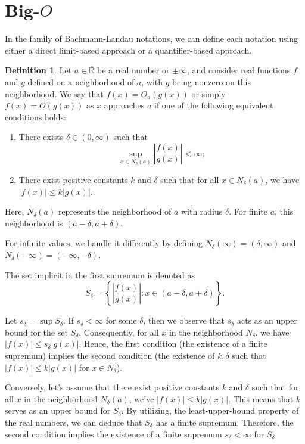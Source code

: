 \documentclass[9pt]{report}
\theoremstyle{definition}
\newtheorem{definition}{Definition}
\newcommand\RRE{\overline{\mathbb R}}
\begin{document}
\section{Big-$O$}\label{ssec:bigo}

In the family of Bachmann-Landau notations, we can define each notation using either a direct limit-based approach or a quantifier-based approach.

\begin{definition}
    Let \(a \in \RRE\) be a real number or \(\pm \infty\), and consider real functions \(f\) and \(g\) defined on a neighborhood of \(a\), with \(g\) being nonzero on this neighborhood. We say that \(f(x) = O_a(g(x))\) or simply \(f(x) = O(g(x))\) as \(x\) approaches \(a\) if one of the following equivalent conditions holds:
    \begin{enumerate}
        \item There exists \(\delta \in (0, \infty)\) such that
            \[\sup_{x \in N_{\delta}(a)} \left| \frac{f(x)}{g(x)} \right| < \infty;\]
        \item There exist positive constants \(k\) and \(\delta\) such that for all \(x \in N_{\delta}(a)\), we have \(\left| f(x) \right| \leq k \left| g(x) \right|\).
    \end{enumerate}
\end{definition}

Here, \(N_{\delta}(a)\) represents the neighborhood of \(a\) with radius \(\delta\). For finite \(a\), this neighborhood is \((a-\delta, a+\delta)\).

For infinite values, we handle it differently by defining \(N_{\delta}(\infty) = (\delta, \infty)\) and \(N_{\delta}(-\infty) = (-\infty, -\delta)\).

The set implicit in the first supremum is denoted as
\[S_{\delta} = \left\{ \left| \frac{f(x)}{g(x)} \right| : x \in (a - \delta, a + \delta) \right\}.\]

Let \(s_{\delta} = \sup S_{\delta}\). If \(s_{\delta} < \infty\) for some \(\delta\), then we observe that \(s_{\delta}\) acts as an upper bound for the set \(S_{\delta}\). Consequently, for all \(x\) in the neighborhood \(N_{\delta}\), we have \(\left| f(x) \right| \leq s_{\delta} \left| g(x) \right|\). Hence, the first condition (the existence of a finite supremum) implies the second condition (the existence of \(k, \delta\) such that \(\left| f(x) \right| \leq k \left| g(x) \right|\) for \(x \in N_{\delta}\)).

Conversely, let's assume that there exist positive constants \(k\) and \(\delta\) such that for all \(x\) in the neighborhood \(N_{\delta}(a)\), we've \(\left| f(x) \right| \leq k \left| g(x) \right|\). This means that \(k\) serves as an upper bound for \(S_{\delta}\). By utilizing, the least-upper-bound property of the real numbers, we can deduce that \(S_{\delta}\) has a finite supremum. Therefore, the second condition implies the existence of a finite supremum \(s_{\delta} < \infty\) for \(S_{\delta}\).
\end{document}

